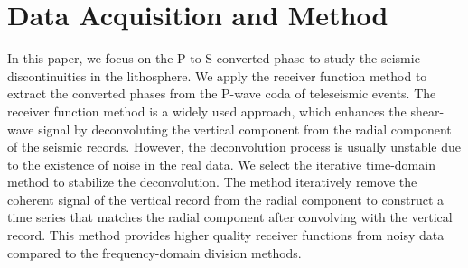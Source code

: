 \section{Data Acquisition and Method}

In this paper, we focus on the P-to-S converted phase to study the seismic discontinuities in the lithosphere. We apply the receiver function method \cite[e.g.][]{Langston_1979,ammon1991isolation} to extract the converted phases from the P-wave coda of teleseismic events. The receiver function method is a widely used approach, which enhances the shear-wave signal by deconvoluting the vertical component from the radial component of the seismic records. However, the deconvolution process is usually unstable due to the existence of noise in the real data. We select the iterative time-domain method \cite{ligorria1999iterative} to stabilize the deconvolution. The method iteratively remove the coherent signal of the vertical record from the radial component to construct a time series that matches the radial component after convolving with the vertical record. This method provides higher quality receiver functions from noisy data compared to the frequency-domain division methods.
